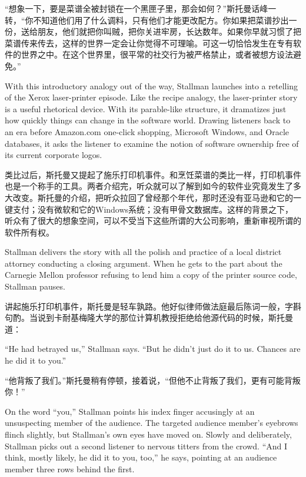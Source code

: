 \ifdefined\chs
“想象一下，要是菜谱全被封锁在一个黑匣子里，那会如何？”斯托曼话峰一转，“你不知道他们用了什么调料，只有他们才能更改配方。你如果把菜谱抄出一份，送给朋友，他们就把你叫贼，把你关进牢房，长达数年。如果你早就习惯了把菜谱传来传去，这样的世界一定会让你觉得不可理喻。可这一切恰恰发生在专有软件的世界之中。在这个世界里，很平常的社交行为被严格禁止，或者被想方设法避免。”
\fi

\ifdefined\eng
With this introductory analogy out of the way, Stallman launches into a retelling of the Xerox laser-printer episode. Like the recipe analogy, the laser-printer story is a useful rhetorical device. With its parable-like structure, it dramatizes just how quickly things can change in the software world. Drawing listeners back to an era before Amazon.com one-click shopping, Microsoft Windows, and Oracle databases, it asks the listener to examine the notion of software ownership free of its current corporate logos.
\fi

\ifdefined\chs
类比过后，斯托曼又提起了施乐打印机事件。和烹饪菜谱的类比一样，打印机事件也是一个称手的工具。两者介绍完，听众就可以了解到如今的软件业究竟发生了多大改变。斯托曼的介绍，把听众拉回了曾经那个年代，那时还没有亚马逊和它的一键支付；没有微软和它的Windows系统；没有甲骨文数据库。这样的背景之下，听众有了很大的想象空间，可以不受当下这些所谓的大公司影响，重新审视所谓的软件所有权。
\fi

\ifdefined\eng
Stallman delivers the story with all the polish and practice of a local district attorney conducting a closing argument. When he gets to the part about the Carnegie Mellon professor refusing to lend him a copy of the printer source code, Stallman pauses.
\fi

\ifdefined\chs
讲起施乐打印机事件，斯托曼是轻车孰路。他好似律师做法庭最后陈词一般，字斟句酌。当说到卡耐基梅隆大学的那位计算机教授拒绝给他源代码的时候，斯托曼道：
\fi

\ifdefined\eng
``He had betrayed us,'' Stallman says. ``But he didn't just do it to us. Chances are he did it to you.''
\fi

\ifdefined\chs
“他背叛了我们。”斯托曼稍有停顿，接着说，“但他不止背叛了我们，更有可能背叛你！”
\fi

\ifdefined\eng
On the word ``you,'' Stallman points his index finger accusingly at an unsuspecting member of the audience. The targeted audience member's eyebrows flinch slightly, but Stallman's own eyes have moved on. Slowly and deliberately, Stallman picks out a second listener to nervous titters from the crowd. ``And I think, mostly likely, he did it to you, too,'' he says, pointing at an audience member three rows behind the first.
\fi

